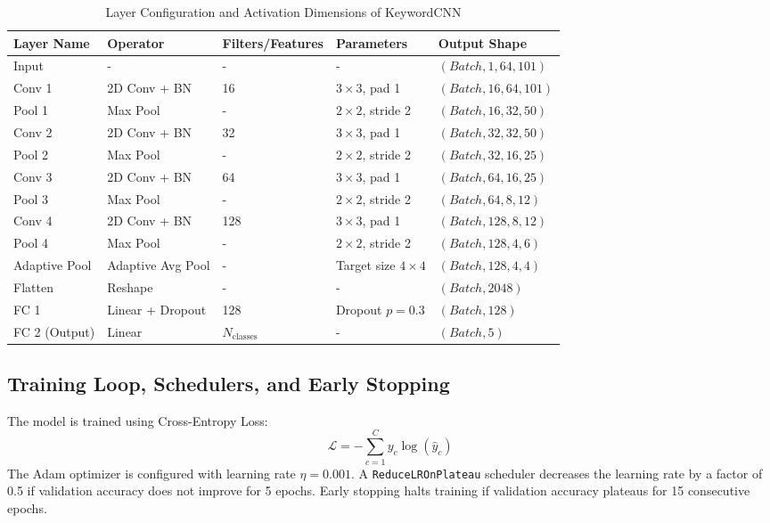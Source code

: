 \begin{table}[H]
\centering
\caption{Layer Configuration and Activation Dimensions of KeywordCNN}
\begin{tabular}{lllll}
\toprule
\textbf{Layer Name} & \textbf{Operator} & \textbf{Filters/Features} & \textbf{Parameters} & \textbf{Output Shape} \\
\midrule
Input & - & - & - & $(Batch, 1, 64, 101)$ \\
Conv 1 & 2D Conv + BN & 16 & $3\times3$, pad 1 & $(Batch, 16, 64, 101)$ \\
Pool 1 & Max Pool & - & $2\times2$, stride 2 & $(Batch, 16, 32, 50)$ \\
Conv 2 & 2D Conv + BN & 32 & $3\times3$, pad 1 & $(Batch, 32, 32, 50)$ \\
Pool 2 & Max Pool & - & $2\times2$, stride 2 & $(Batch, 32, 16, 25)$ \\
Conv 3 & 2D Conv + BN & 64 & $3\times3$, pad 1 & $(Batch, 64, 16, 25)$ \\
Pool 3 & Max Pool & - & $2\times2$, stride 2 & $(Batch, 64, 8, 12)$ \\
Conv 4 & 2D Conv + BN & 128 & $3\times3$, pad 1 & $(Batch, 128, 8, 12)$ \\
Pool 4 & Max Pool & - & $2\times2$, stride 2 & $(Batch, 128, 4, 6)$ \\
Adaptive Pool & Adaptive Avg Pool & - & Target size $4\times4$ & $(Batch, 128, 4, 4)$ \\
Flatten & Reshape & - & - & $(Batch, 2048)$ \\
FC 1 & Linear + Dropout & 128 & Dropout $p=0.3$ & $(Batch, 128)$ \\
FC 2 (Output) & Linear & $N_{\text{classes}}$ & - & $(Batch, 5)$ \\
\bottomrule
\end{tabular}
\label{tab:pytorch_cnn_dims}
\end{table}

\subsection{Training Loop, Schedulers, and Early Stopping}
The model is trained using Cross-Entropy Loss:
\begin{equation}
    \mathcal{L} = -\sum_{c=1}^{C} y_c \log(\hat{y}_c)
\end{equation}
The Adam optimizer is configured with learning rate $\eta = 0.001$. A \texttt{ReduceLROnPlateau} scheduler decreases the learning rate by a factor of 0.5 if validation accuracy does not improve for 5 epochs. Early stopping halts training if validation accuracy plateaus for 15 consecutive epochs.


